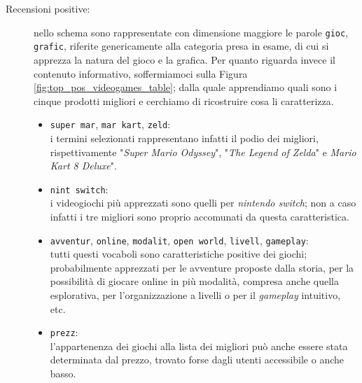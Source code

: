 				\begin{description}
					\item[Recensioni positive:]
					nello schema sono rappresentate con dimensione maggiore le parole \verb|gioc|, \verb|grafic|, riferite genericamente alla categoria presa in esame, di cui si apprezza la natura del gioco e la grafica. Per quanto riguarda invece il contenuto informativo, soffermiamoci sulla Figura \ref{fig:top_pos_videogames_table}; dalla quale apprendiamo quali sono i cinque prodotti migliori e cerchiamo di ricostruire cosa li caratterizza.
					\begin{itemize}
						\item \texttt{super mar}, \texttt{mar kart}, \texttt{zeld}: \\
						i termini selezionati rappresentano infatti il podio dei migliori, rispettivamente "\textit{Super Mario Odyssey}", "\textit{The Legend of Zelda}" e \textit{Mario Kart 8 Deluxe}". 
						\item \texttt{nint switch}: \\
						i videogiochi più apprezzati sono quelli per \textit{nintendo switch}; non a caso infatti i tre migliori sono proprio accomunati da questa caratteristica.
						\item \texttt{avventur}, \texttt{online}, \texttt{modalit}, \texttt{open world}, \texttt{livell}, \texttt{gameplay}: \\
						tutti questi vocaboli sono caratteristiche positive dei giochi; probabilmente apprezzati per le avventure proposte dalla storia, per la possibilità di giocare online in più modalità, compresa anche quella esplorativa, per l'organizzazione a livelli o per il \textit{gameplay} intuitivo, etc.
						\item \texttt{prezz}: \\l'appartenenza dei giochi alla lista dei migliori può anche essere stata determinata dal prezzo, trovato forse dagli utenti accessibile o anche basso.
					\end{itemize}	
									

\end{description}
